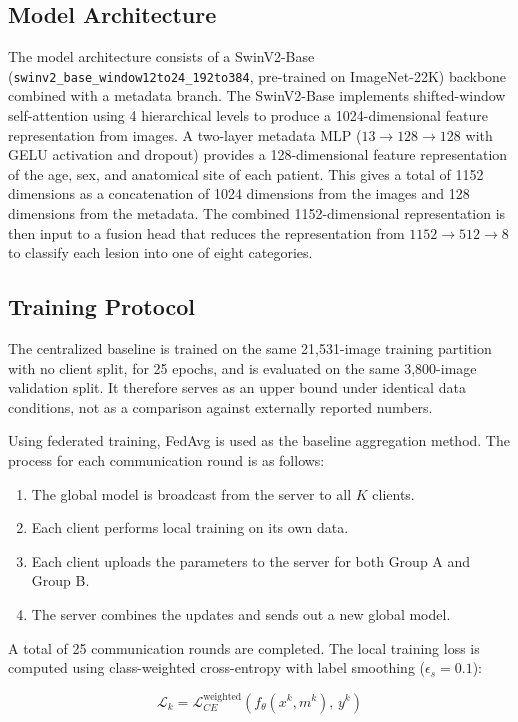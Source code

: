 \documentclass{ieeeaccess}
\begin{document}
\subsection{Model Architecture}

The model architecture consists of a SwinV2-Base (\texttt{swinv2\_base\_window12to24\_192to384}, pre-trained on ImageNet-22K) backbone combined with a metadata branch. The SwinV2-Base implements shifted-window self-attention using 4 hierarchical levels to produce a 1024-dimensional feature representation from images. A two-layer metadata MLP ($13 \to 128 \to 128$ with GELU activation and dropout) provides a 128-dimensional feature representation of the age, sex, and anatomical site of each patient. This gives a total of 1152 dimensions as a concatenation of 1024 dimensions from the images and 128 dimensions from the metadata. The combined 1152-dimensional representation is then input to a fusion head that reduces the representation from $1152 \to 512 \to 8$ to classify each lesion into one of eight categories.

\subsection{Training Protocol}

The centralized baseline is trained on the same 21,531-image training partition with no client split, for 25 epochs, and is evaluated on the same 3,800-image validation split. It therefore serves as an upper bound under identical data conditions, not as a comparison against externally reported numbers.

Using federated training, FedAvg is used as the baseline aggregation method. The process for each communication round is as follows:
\begin{enumerate}
    \item The global model is broadcast from the server to all $K$ clients.
    \item Each client performs local training on its own data.
    \item Each client uploads the parameters to the server for both Group A and Group B.
    \item The server combines the updates and sends out a new global model.
\end{enumerate}
A total of 25 communication rounds are completed. The local training loss is computed using class-weighted cross-entropy with label smoothing ($\epsilon_s = 0.1$):

\begin{equation}
\label{eq:local_loss}
\mathcal{L}_k = \mathcal{L}_{CE}^{\text{weighted}}(f_{\theta}(x^k, m^k),\, y^k)
\end{equation}
\end{document}
